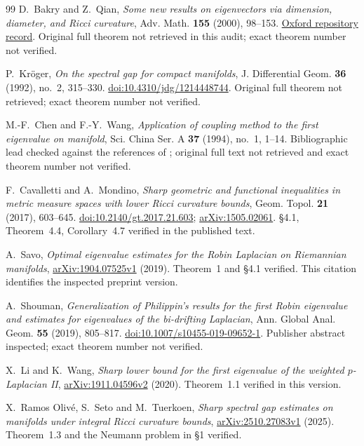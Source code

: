 \documentclass[12pt]{amsart}
\theoremstyle{definition}
\theoremstyle{remark}
\numberwithin{equation}{section}
\begin{document}
\begin{thebibliography}{99}
 D.~Bakry and Z.~Qian,
\emph{Some new results on eigenvectors via dimension, diameter, and Ricci curvature},
Adv. Math. \textbf{155} (2000), 98--153.
\href{https://ora.ox.ac.uk/objects/uuid:8eef7c4e-f91b-4ed1-a68f-ca79c2e45061}{Oxford repository record}.
Original full theorem not retrieved in this audit; exact theorem number not verified.

 P.~Kr\"oger,
\emph{On the spectral gap for compact manifolds},
J. Differential Geom. \textbf{36} (1992), no.~2, 315--330.
\href{https://doi.org/10.4310/jdg/1214448744}{doi:10.4310/jdg/1214448744}.
Original full theorem not retrieved; exact theorem number not verified.

 M.-F.~Chen and F.-Y.~Wang,
\emph{Application of coupling method to the first eigenvalue on manifold},
Sci. China Ser. A \textbf{37} (1994), no.~1, 1--14.
Bibliographic lead checked against the references of \cite{Liu}; original full text not retrieved and exact theorem number not verified.

 F.~Cavalletti and A.~Mondino,
\emph{Sharp geometric and functional inequalities in metric measure spaces with lower Ricci curvature bounds},
Geom. Topol. \textbf{21} (2017), 603--645.
\href{https://doi.org/10.2140/gt.2017.21.603}{doi:10.2140/gt.2017.21.603};
\href{https://arxiv.org/abs/1505.02061}{arXiv:1505.02061}.
\S4.1, Theorem~4.4, Corollary~4.7 verified in the published text.

 A.~Savo,
\emph{Optimal eigenvalue estimates for the Robin Laplacian on Riemannian manifolds},
\href{https://arxiv.org/abs/1904.07525}{arXiv:1904.07525v1} (2019).
Theorem~1 and \S4.1 verified. This citation identifies the inspected preprint version.

 A.~Shouman,
\emph{Generalization of Philippin's results for the first Robin eigenvalue and estimates for eigenvalues of the bi-drifting Laplacian},
Ann. Global Anal. Geom. \textbf{55} (2019), 805--817.
\href{https://doi.org/10.1007/s10455-019-09652-1}{doi:10.1007/s10455-019-09652-1}.
Publisher abstract inspected; exact theorem number not verified.

 X.~Li and K.~Wang,
\emph{Sharp lower bound for the first eigenvalue of the weighted $p$-Laplacian II},
\href{https://arxiv.org/abs/1911.04596}{arXiv:1911.04596v2} (2020).
Theorem~1.1 verified in this version.

 X.~Ramos Oliv\'e, S.~Seto and M.~Tuerkoen,
\emph{Sharp spectral gap estimates on manifolds under integral Ricci curvature bounds},
\href{https://arxiv.org/abs/2510.27083}{arXiv:2510.27083v1} (2025).
Theorem~1.3 and the Neumann problem in \S1 verified.


\end{thebibliography}
\end{document}
